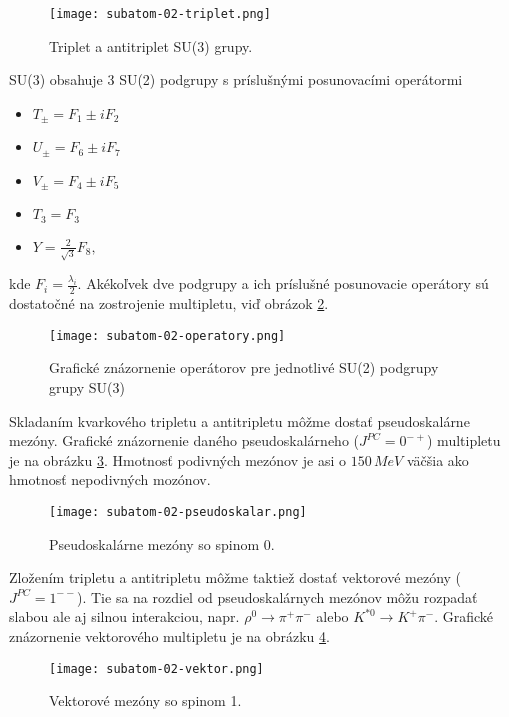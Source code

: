 \documentclass[../../main.tex]{subfiles}
\begin{document}
\begin{figure}[!h]
\texttt{[image: subatom-02-triplet.png]}
\centering
\caption{Triplet a antitriplet SU(3) grupy.}
\label{sf2:fig:triplet}
\end{figure}

SU(3) obsahuje 3 SU(2) podgrupy s príslušnými posunovacími operátormi 
\begin{itemize}
\item $T_{\pm} = F_1 \pm iF_{2}$
\item $U_{\pm} = F_6 \pm iF_{7}$
\item $V_{\pm} = F_4 \pm iF_{5}$
\item $T_3 = F_3$
\item $Y = \frac{2}{\sqrt{3}}F_8,$
\end{itemize}
kde $F_i = \frac{\lambda_i}{2}$. Akékoľvek dve podgrupy a ich príslušné posunovacie operátory sú dostatočné na zostrojenie multipletu, viď obrázok \ref{sf2:fig:operatory}. 

\begin{figure}[!h]
\texttt{[image: subatom-02-operatory.png]}
\centering
\caption{Grafické znázornenie operátorov pre jednotlivé SU(2) podgrupy grupy SU(3)}
\label{sf2:fig:operatory}
\end{figure}

Skladaním kvarkového tripletu a antitripletu môžme dostať pseudoskalárne mezóny. Grafické znázornenie daného pseudoskalárneho ($J^{PC}=0^{-+}$) multipletu je na obrázku \ref{sf2:fig:pseudoskalar}. Hmotnosť podivných mezónov je asi o $150\,\unit{MeV}$ väčšia ako hmotnosť nepodivných mozónov.

\begin{figure}[!h]
\texttt{[image: subatom-02-pseudoskalar.png]}
\centering
\caption{Pseudoskalárne mezóny so spinom 0.}
\label{sf2:fig:pseudoskalar}
\end{figure}

Zložením tripletu a antitripletu môžme taktiež dostať vektorové mezóny ($J^{PC}=1^{--}$). Tie sa na rozdiel od pseudoskalárnych mezónov môžu rozpadať slabou ale aj silnou interakciou, napr. $\rho^0 \rightarrow \pi^{+}\pi^{-}$ alebo $K^{*0} \rightarrow K^{+}\pi^{-}$. Grafické znázornenie vektorového multipletu je na obrázku \ref{sf2:fig:vektor}.

\begin{figure}[!h]
\texttt{[image: subatom-02-vektor.png]}
\centering
\caption{Vektorové mezóny so spinom 1.}
\label{sf2:fig:vektor}
\end{figure}
\end{document}

